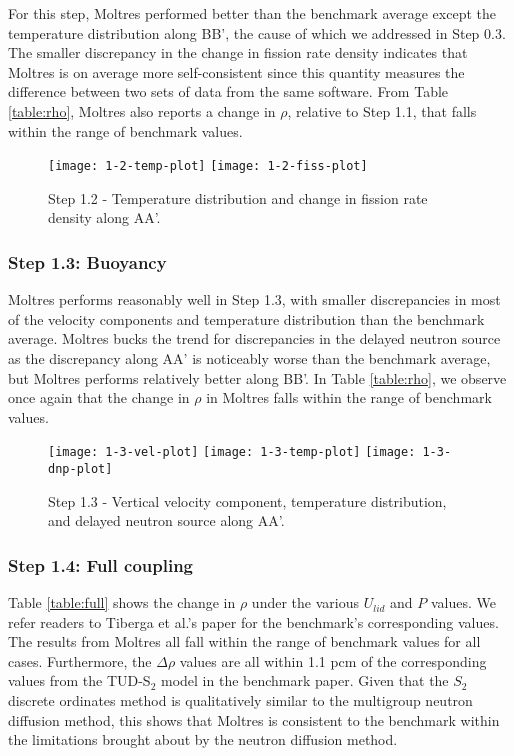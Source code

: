 For this step, Moltres performed better than the benchmark average except
the temperature distribution along BB', the cause of which we
addressed in Step 0.3. The smaller discrepancy in the change in fission rate
density indicates that Moltres is on average more self-consistent since this
quantity measures the difference between two sets of data from the same
software. From Table \ref{table:rho}, Moltres also reports a change in $\rho$,
relative to Step 1.1, that falls within the range of benchmark values.
%
\begin{figure}[h!]
	\centering
	\texttt{[image: 1-2-temp-plot]}
	\texttt{[image: 1-2-fiss-plot]}
	\caption{Step 1.2 - Temperature distribution and change in fission rate
	density along AA'.}
	\label{fig:1.2}
\end{figure}

\subsubsection{Step 1.3: Buoyancy}

Moltres performs reasonably well in Step 1.3, with smaller
discrepancies in most of the velocity components and temperature distribution
than the benchmark average. Moltres bucks the trend for discrepancies
in the delayed neutron source as the discrepancy along AA' is
noticeably worse than the benchmark average, but Moltres performs relatively
better along BB'. In Table \ref{table:rho}, we observe once again that the
change in $\rho$ in Moltres falls within the range of benchmark values.
%
\begin{figure}[h!]
	\centering
	\texttt{[image: 1-3-vel-plot]}
	\texttt{[image: 1-3-temp-plot]}
	\texttt{[image: 1-3-dnp-plot]}
	\caption{Step 1.3 - Vertical velocity component, temperature distribution,
	and delayed neutron source along AA'.}
	\label{fig:1.3}
\end{figure}

\subsubsection{Step 1.4: Full coupling}

Table \ref{table:full} shows the change in $\rho$ under the various $U_{lid}$
and $P$ values. We refer readers to Tiberga et al.'s paper
\citep{tiberga_results_2020} for the benchmark's corresponding values.
The results from Moltres all fall within the range of benchmark values for all
cases. Furthermore, the $\Delta\rho$ values are all within 1.1 pcm of the
corresponding values from the TUD-S$_2$ model in the benchmark paper. Given
that the $S_2$ discrete ordinates method is qualitatively similar to the
multigroup neutron diffusion method, this shows that Moltres is
consistent to the benchmark within the limitations brought about by the neutron
diffusion method.

